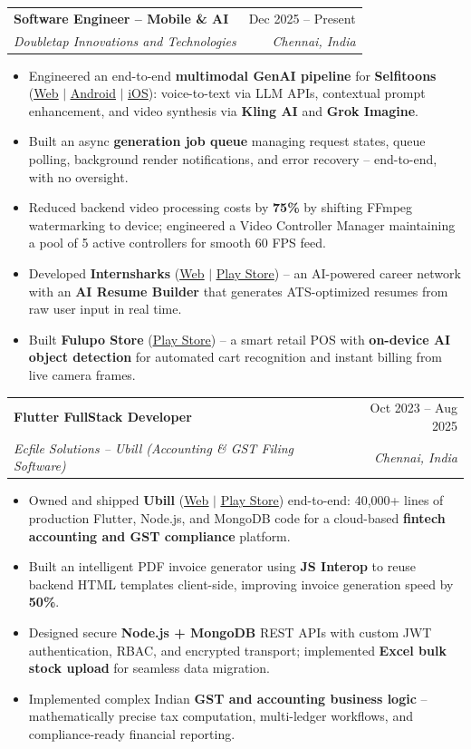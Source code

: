 \documentclass[letterpaper,10pt]{article}
\makeatletter
\newcommand{\resumeItem}[1]{
  \item\small{
    {#1 \vspace{-2pt}}
  }
}
\newcommand{\resumeSubheading}[4]{
  \vspace{-2pt}\item
    \begin{tabular*}{0.97\textwidth}[t]{l@{\extracolsep{\fill}}r}
      \textbf{#1} & #2 \\
      \textit{\small#3} & \textit{\small #4} \\
    \end{tabular*}\vspace{-7pt}
}
\newcommand{\resumeItemListStart}{\begin{itemize}}
\newcommand{\resumeItemListEnd}{\end{itemize}\vspace{-5pt}}
\makeatother
\begin{document}
    \resumeSubheading
      {Software Engineer -- Mobile \& AI}{Dec 2025 -- Present}
      {Doubletap Innovations and Technologies}{Chennai, India}
      \resumeItemListStart
        \resumeItem{Engineered an end-to-end \textbf{multimodal GenAI pipeline} for \textbf{Selfitoons} (\href{https://selfitoons.ai/}{\underline{Web}} $|$ \href{https://play.google.com/store/apps/details?id=com.doubletap.ai.selfitoons}{\underline{Android}} $|$ \href{https://apps.apple.com/in/app/selfitoons/id6758597947}{\underline{iOS}}): voice-to-text via LLM APIs, contextual prompt enhancement, and video synthesis via \textbf{Kling AI} and \textbf{Grok Imagine}.}
        \resumeItem{Built an async \textbf{generation job queue} managing request states, queue polling, background render notifications, and error recovery -- end-to-end, with no oversight.}
        \resumeItem{Reduced backend video processing costs by \textbf{75\%} by shifting FFmpeg watermarking to device; engineered a Video Controller Manager maintaining a pool of 5 active controllers for smooth 60 FPS feed.}
        \resumeItem{Developed \textbf{Internsharks} (\href{https://internsharks.ai/}{\underline{Web}} $|$ \href{https://play.google.com/store/apps/details?id=com.doubletap.internsharks.ai}{\underline{Play Store}}) -- an AI-powered career network with an \textbf{AI Resume Builder} that generates ATS-optimized resumes from raw user input in real time.}
        \resumeItem{Built \textbf{Fulupo Store} (\href{https://play.google.com/store/apps/details?id=com.doubletap.fulupostore}{\underline{Play Store}}) -- a smart retail POS with \textbf{on-device AI object detection} for automated cart recognition and instant billing from live camera frames.}
      \resumeItemListEnd

    \resumeSubheading
      {Flutter FullStack Developer}{Oct 2023 -- Aug 2025}
      {Ecfile Solutions -- Ubill (Accounting \& GST Filing Software)}{Chennai, India}
      \resumeItemListStart
        \resumeItem{Owned and shipped \textbf{Ubill} (\href{https://app.ubill.tech/}{\underline{Web}} $|$ \href{https://play.google.com/store/apps/details?id=com.ubill.tech}{\underline{Play Store}}) end-to-end: 40,000+ lines of production Flutter, Node.js, and MongoDB code for a cloud-based \textbf{fintech accounting and GST compliance} platform.}
        \resumeItem{Built an intelligent PDF invoice generator using \textbf{JS Interop} to reuse backend HTML templates client-side, improving invoice generation speed by \textbf{50\%}.}
        \resumeItem{Designed secure \textbf{Node.js + MongoDB} REST APIs with custom JWT authentication, RBAC, and encrypted transport; implemented \textbf{Excel bulk stock upload} for seamless data migration.}
        \resumeItem{Implemented complex Indian \textbf{GST and accounting business logic} -- mathematically precise tax computation, multi-ledger workflows, and compliance-ready financial reporting.}
      \resumeItemListEnd
\end{document}
